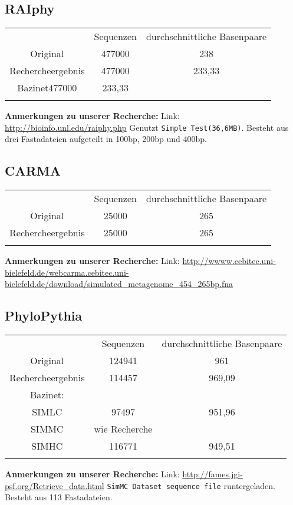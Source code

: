 \documentclass[a4paper, 11pt]{scrartcl}
\begin{document}
\begin{flushleft}
\subsection{RAIphy}
\begin{tabular}{ccc}
& Sequenzen & durchschnittliche Basenpaare \\
Original&477000&238\\
Rechercheergebnis&477000&233,33\\
Bazinet477000&233,33\\
&&\\
\end{tabular}
\linebreak
\color{red}
\textbf{Anmerkungen zu unserer Recherche:}\linebreak
Link: \url{http://bioinfo.unl.edu/raiphy.php}
\linebreak
Genutzt \texttt{Simple Test(36,6MB)}.
\linebreak
Besteht aus drei Fastadateien aufgeteilt in 100bp, 200bp und 400bp.
\color{black}
\newpage

\subsection{CARMA}
\begin{tabular}{ccc}
& Sequenzen & durchschnittliche Basenpaare \\
Original&25000&265\\
Rechercheergebnis&25000&265\\
&&\\
\end{tabular}
\linebreak
\color{red}
\textbf{Anmerkungen zu unserer Recherche:}\linebreak
Link: \url{http://wwww.cebitec.uni-bielefeld.de/webcarma.cebitec.uni-bielefeld.de/download/simulated_metagenome_454_265bp.fna}
\color{black}

\subsection{PhyloPythia}
\begin{tabular}{ccc}
& Sequenzen & durchschnittliche Basenpaare \\
Original&124941&961\\
Rechercheergebnis&114457&969,09\\
Bazinet:&\\
SIMLC& 97497&951,96\\
SIMMC& wie Recherche\\
SIMHC&116771&949,51\\
&&\\
\end{tabular}
\linebreak
\color{red}
\textbf{Anmerkungen zu unserer Recherche:}\linebreak
Link: \url{http://fames.jgi-psf.org/Retrieve_data.html}
\linebreak
\texttt{SimMC Dataset sequence file} runtergeladen.
\linebreak
Besteht aus 113 Fastadateien.
\color{black}


\end{flushleft}
\end{document}
